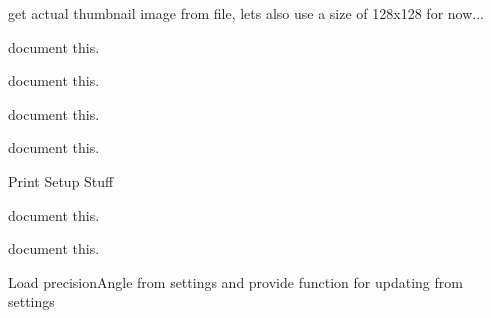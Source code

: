 \begin{DoxyRefList}
\label{todo__todo000022}%
%
get actual thumbnail image from file, lets also use a size of 128x128 for now... 
\item[Member \mbox{\hyperlink{imgui__main_8c_a2215c9aae4a42877f53d58d5072dcc65}{preview\+\_\+off}} (void)]\label{todo__todo000038}%
%
document this.  
\item[Member \mbox{\hyperlink{imgui__main_8c_ac98567c915ff93cc4042dc100366bfc1}{preview\+\_\+on\+\_\+action}} (void)]\label{todo__todo000129}%
%
document this.  
\item[Member \mbox{\hyperlink{imgui__main_8c_ac09c52d8c04451a1763efb240514db61}{print\+\_\+action}} (void)]\label{todo__todo000115}%
%
document this.  
\item[Member \mbox{\hyperlink{imgui__main_8c_a5c67ae25520041868d38ec8c49589553}{print\+\_\+area\+\_\+action}} (void)]\label{todo__todo000125}%
%
document this.  
\item[Member \mbox{\hyperlink{imgui__main_8c_a7f83a6bf28f21699753530d3a659a0bd}{Print\+Area}} (Emb\+Real x, Emb\+Real y, Emb\+Real w, Emb\+Real h)]\label{todo__todo000185}%
%
Print Setup Stuff  
\item[Member \mbox{\hyperlink{imgui__main_8c_adcadf5f247e819122ddc4edba08540c1}{prompt\+Input\+Next}} (void)]\label{todo__todo000178}%
%
document this.  
\item[Member \mbox{\hyperlink{imgui__main_8c_a04881913e0d4bcc19bddf5b53036c24e}{prompt\+Input\+Previous}} (void)]\label{todo__todo000177}%
%
document this.  
\item[Member \mbox{\hyperlink{imgui__main_8c_a6fec08ec06d2be895e3c320f3648b398}{property\+\_\+editor}} (void)]\label{todo__todo000069}%
%
Load precision\+Angle from settings and provide function for updating from settings 




\end{DoxyRefList}
